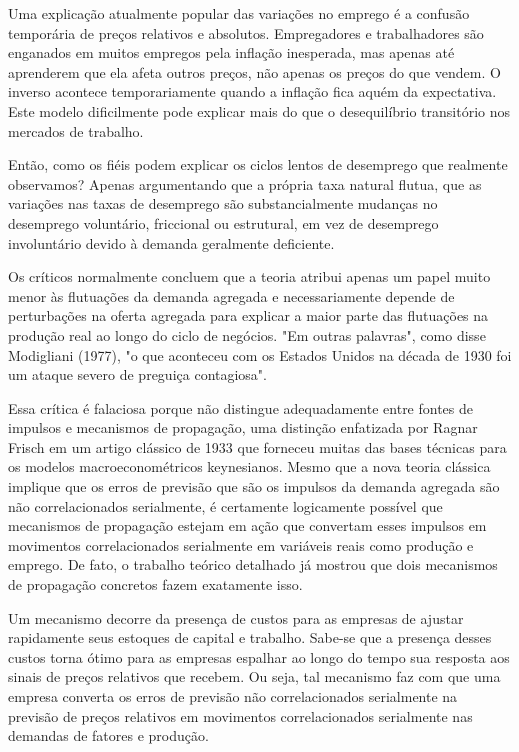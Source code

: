 \documentclass[12pt]{article}
\begin{document}
Uma explicação atualmente popular das variações no emprego é a confusão temporária de preços relativos e absolutos. Empregadores e trabalhadores são enganados em muitos empregos pela inflação inesperada, mas apenas até aprenderem que ela afeta outros preços, não apenas os preços do que vendem. O inverso acontece temporariamente quando a inflação fica aquém da expectativa. Este modelo dificilmente pode explicar mais do que o desequilíbrio transitório nos mercados de trabalho.

Então, como os fiéis podem explicar os ciclos lentos de desemprego que realmente observamos? Apenas argumentando que a própria taxa natural flutua, que as variações nas taxas de desemprego são substancialmente mudanças no desemprego voluntário, friccional ou estrutural, em vez de desemprego involuntário devido à demanda geralmente deficiente.

Os críticos normalmente concluem que a teoria atribui apenas um papel muito menor às flutuações da demanda agregada e necessariamente depende de perturbações na oferta agregada para explicar a maior parte das flutuações na produção real ao longo do ciclo de negócios. "Em outras palavras", como disse Modigliani (1977), "o que aconteceu com os Estados Unidos na década de 1930 foi um ataque severo de preguiça contagiosa".

Essa crítica é falaciosa porque não distingue adequadamente entre fontes de impulsos e mecanismos de propagação, uma distinção enfatizada por Ragnar Frisch em um artigo clássico de 1933 que forneceu muitas das bases técnicas para os modelos macroeconométricos keynesianos. Mesmo que a nova teoria clássica implique que os erros de previsão que são os impulsos da demanda agregada são não correlacionados serialmente, é certamente logicamente possível que mecanismos de propagação estejam em ação que convertam esses impulsos em movimentos correlacionados serialmente em variáveis reais como produção e emprego. De fato, o trabalho teórico detalhado já mostrou que dois mecanismos de propagação concretos fazem exatamente isso.

Um mecanismo decorre da presença de custos para as empresas de ajustar rapidamente seus estoques de capital e trabalho. Sabe-se que a presença desses custos torna ótimo para as empresas espalhar ao longo do tempo sua resposta aos sinais de preços relativos que recebem. Ou seja, tal mecanismo faz com que uma empresa converta os erros de previsão não correlacionados serialmente na previsão de preços relativos em movimentos correlacionados serialmente nas demandas de fatores e produção.
\end{document}
